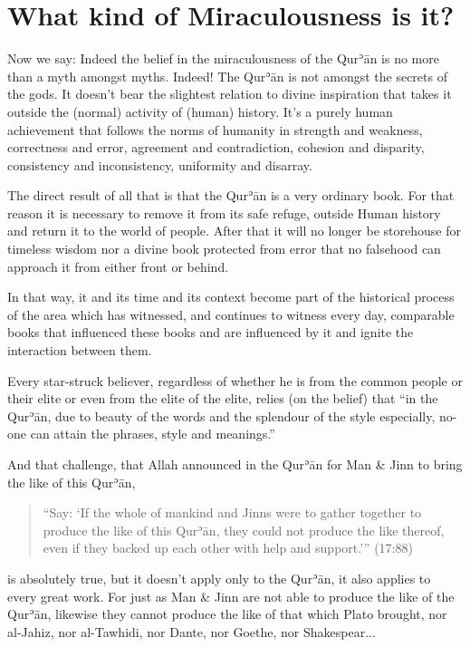 \documentclass[12pt]{memoir}
\def\´{ʾ} %
\def \Quran{Qur\-\´ān} %
\let \Qrn=\Quran      %
\def\–{-\hskip0pt}
\newcommand{\QRef}[1]{{\color{darkblue}#1}}
\begin{document}


\section{What kind of Miraculousness is it?}

Now we say: Indeed the belief in the miraculousness of the \Qrn{} is no more
than a myth amongst myths. Indeed! The \Qrn{} is not amongst the secrets of the
gods. It doesn’t bear the slightest relation to divine inspiration that takes
it outside the (normal) activity of (human) history. It’s a purely human
achievement that follows the norms of humanity in strength and weakness,
correctness and error, agreement and contradiction, cohesion and disparity,
consistency and inconsistency, uniformity and disarray.

The direct result of all that is that the \Qrn{} is a very ordinary book. For
that reason it is necessary to remove it from its safe refuge, outside Human
history and return it to the world of people. After that it will no longer be
storehouse for timeless wisdom nor a divine book protected from error that no
falsehood can approach it from either front or behind.

In that way, it and its time and its context become part of the historical
process of the area which has witnessed, and continues to witness every day,
comparable books that influenced these books and are influenced by it and
ignite the interaction between them.

Every star\–struck believer, regardless of whether he is from the common people
or their elite or even from the elite of the elite, relies (on the belief) that
“in the \Quran, due to beauty of the words and the splendour of the style
especially, no-one can attain the phrases, style and meanings.”\footnotemark


And that challenge, that Allah announced in the \Qrn{} for Man \& Jinn to bring
the like of this \Quran,

\begin{quote}
“Say: ‘If the whole of mankind and Jinns were to gather together
to produce the like of this \Quran, they could not produce the like thereof,
even if they backed up each other with help and support.’” (\QRef{17:88})
\end{quote}

is absolutely true, but it doesn’t apply only to the \Quran, it also applies to
every great work. For just as Man \& Jinn are not able to produce the like of
the \Quran, likewise they cannot produce the like of that which Plato brought,
nor al\–Jahiz, nor al\–Tawhidi, nor Dante, nor Goethe, nor Shakespear...
\end{document}
